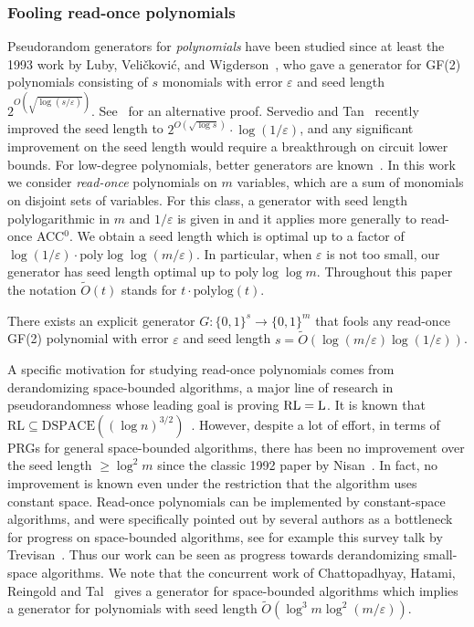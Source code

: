 \documentclass{toc}
\newcommand{\zo}{\{0,1\}}
\def\eps{\varepsilon}
\def\poly{\mathrm{poly}}
\def\polylog{\mathrm{polylog}}
\begin{document}
\subsubsection{Fooling read-once polynomials} %
Pseudorandom generators for \emph{polynomials} have been studied
since at least the 1993 work by Luby, Veli{\v c}kovi{\'c}, and
Wigderson~\cite{LubyVW93}, who gave a generator for GF(2) polynomials consisting of $s$ monomials with error $\eps$ and seed length $2^{O(\sqrt{\log(s/\eps)})}$.
See~\cite{Viola-SYMAC0} for an alternative proof.  
Servedio and Tan~\cite{ServedioT19} recently improved the seed length 
to $2^{O(\sqrt{\log s})} \cdot \log(1/\eps)$, and any significant 
improvement on the seed length would require
%
%
a breakthrough  %
on circuit lower bounds.  For low-degree polynomials,
better generators are known~\cite{BogdanovV10,Lovett09,Viola-d}.  
In this work we consider \emph{read-once} polynomials on $m$ variables, 
which are a sum of monomials on disjoint
sets of   %
variables.
For this class, a generator with seed length
polylogarithmic in $m$ and $1/\eps$ is given in \cite{GavinskyLS12} and it
applies more generally to read-once ACC$^0$. 
We obtain a seed length which is optimal up to a factor of $\log(1/\eps) \cdot \poly\log\log(m/\eps)$.
In particular, when $\eps$ is not too small,
our generator has seed length optimal up to $\poly \log \log m$.
Throughout this paper the notation $\tilde{O}(t)$ stands for 
$t \cdot \polylog(t)$.

\begin{theorem} \label{t-prg-poly-intro}
There exists an explicit generator $G\colon \zo^s \to \zo^m$ that fools
any read-once GF(2) polynomial with error $\eps$ and seed length
$s = \tilde O(\log (m/\eps) \log(1/\eps))$.
\end{theorem}
%
%
A specific motivation for studying read-once polynomials comes from derandomizing space-bounded algorithms, 
a major line of research in pseudorandomness whose leading goal is proving $\textnormal{RL}=\textnormal{L}$.
It is known that $\mathrm{RL} \subseteq \mathrm{DSPACE}((\log n)^{3/2})$~\cite{SaksZ99}.
However, 
%
%
%
%
despite a lot of effort, in terms of PRGs for general space-bounded algorithms, there has
been no improvement over the seed length $\ge \log^2 m$ since the classic
1992 paper by Nisan~\cite{Nisan92}.
In fact, no improvement is known even under the restriction that the algorithm
%
uses constant space.   %
Read-once polynomials can be implemented by constant-space algorithms, and were specifically pointed out by several
%
authors   %
as a bottleneck for progress on space-bounded algorithms, see for example this survey talk by Trevisan~\cite{Trevisan10-openproblems}.
Thus our work can be seen as progress towards derandomizing small-space
algorithms.
We note that the concurrent work of Chattopadhyay, Hatami, Reingold and Tal~\cite{ChattopadhyayHRT18} gives a generator for space-bounded algorithms which implies a generator for polynomials with seed length $\tilde O(\log^3 m \log^2(m/\eps))$.
\end{document}

